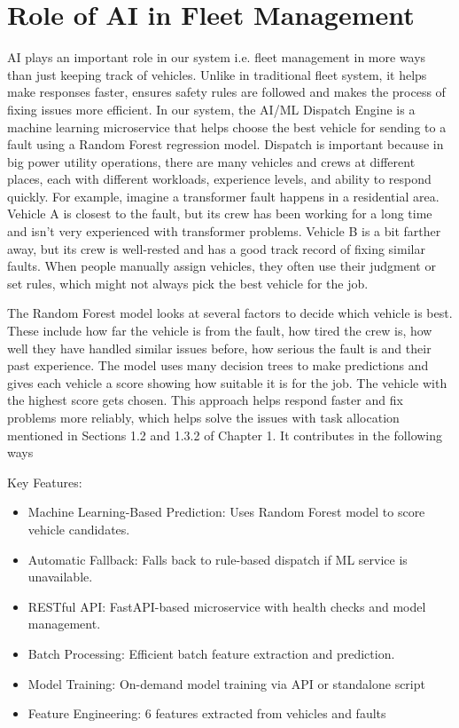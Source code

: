 \section{Role of AI in Fleet Management}
AI plays an important role in our system i.e. fleet management in more ways than just keeping track of vehicles. Unlike in traditional fleet system, it helps make responses faster, ensures safety rules are followed and makes the process of fixing issues more efficient. In our system, the AI/ML Dispatch Engine is a machine learning microservice that helps choose the best vehicle for sending to a fault using a Random Forest regression model. Dispatch is important because in big power utility operations, there are many vehicles and crews at different places, each with different workloads, experience levels, and ability to respond quickly. For example, imagine a transformer fault happens in a residential area. Vehicle A is closest to the fault, but its crew has been working for a long time and isn't very experienced with transformer problems. Vehicle B is a bit farther away, but its crew is well-rested and has a good track record of fixing similar faults. When people manually assign vehicles, they often use their judgment or set rules, which might not always pick the best vehicle for the job.

The Random Forest model looks at several factors to decide which vehicle is best. These include how far the vehicle is from the fault, how tired the crew is, how well they have handled similar issues before, how serious the fault is and their past experience. The model uses many decision trees to make predictions and gives each vehicle a score showing how suitable it is for the job. The vehicle with the highest score gets chosen. This approach helps respond faster and fix problems more reliably, which helps solve the issues with task allocation mentioned in Sections 1.2 and 1.3.2 of Chapter 1. It contributes in the following ways

Key Features:
\begin{itemize}
    \item Machine Learning-Based Prediction: Uses Random Forest model to score vehicle candidates.
    \item Automatic Fallback: Falls back to rule-based dispatch if ML service is unavailable.
    \item RESTful API: FastAPI-based microservice with health checks and model management.
    \item Batch Processing: Efficient batch feature extraction and prediction.
    \item Model Training: On-demand model training via API or standalone script
    \item Feature Engineering: 6 features extracted from vehicles and faults
\end{itemize}

